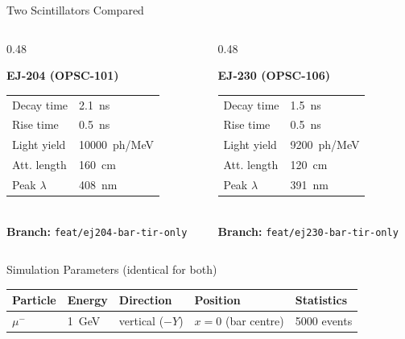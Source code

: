 \documentclass[aspectratio=169,10pt]{beamer}
\begin{document}
\begin{frame}{Two Scintillators Compared}

\begin{columns}[T]

  \begin{column}{0.48\textwidth}
  \begin{alertblock}{\textcolor{ej204col}{\textbf{EJ-204 (OPSC-101)}}}
    \begin{tabular}{@{}ll@{}}
      Decay time  & \SI{2.1}{ns} \\
      Rise time   & \SI{0.5}{ns} \\
      Light yield & \SI{10000}{ph/MeV} \\
      Att. length & \SI{160}{cm} \\
      Peak $\lambda$ & \SI{408}{nm} \\
    \end{tabular}\\[0.4em]
    \textbf{Branch:} \texttt{feat/ej204-bar-tir-only}
  \end{alertblock}
  \end{column}

  \begin{column}{0.48\textwidth}
  \begin{alertblock}{\textcolor{ej230col}{\textbf{EJ-230 (OPSC-106)}}}
    \begin{tabular}{@{}ll@{}}
      Decay time  & \SI{1.5}{ns} \\
      Rise time   & \SI{0.5}{ns} \\
      Light yield & \SI{9200}{ph/MeV} \\
      Att. length & \SI{120}{cm} \\
      Peak $\lambda$ & \SI{391}{nm} \\
    \end{tabular}\\[0.4em]
    \textbf{Branch:} \texttt{feat/ej230-bar-tir-only}
  \end{alertblock}
  \end{column}

\end{columns}

\vspace{0.7em}

\begin{block}{Simulation Parameters (identical for both)}
  \centering
  \begin{tabular}{@{}lllll@{}}
    \toprule
    Particle & Energy & Direction & Position & Statistics \\
    \midrule
    $\mu^-$ & \SI{1}{GeV} & vertical ($-Y$) & $x=0$ (bar centre) & 5000 events \\
    \bottomrule
  \end{tabular}
\end{block}


\end{frame}
\end{document}
